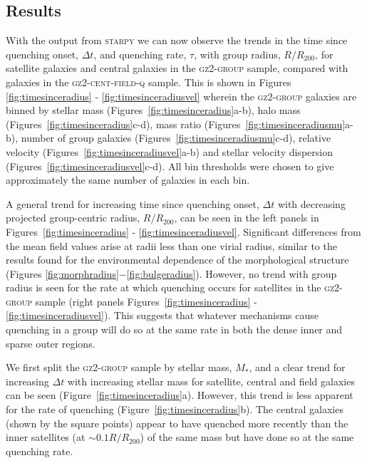 \documentclass[useAMS,usenatbib]{mn2e}
\begin{document}
\subsection{Results}\label{sec:resultssfhs}

With the output from \textsc{starpy} we can now observe the trends in the time since quenching onset, $\Delta t$, and quenching rate, $\tau$, with group radius, $R/R_{200}$, for satellite galaxies and central galaxies in the \textsc{gz2-group} sample, compared with galaxies in the \textsc{gz2-cent-field-q} sample. This is shown in Figures \ref{fig:timesinceradius} - \ref{fig:timesinceradiusvel} wherein the \textsc{gz2-group} galaxies are binned by stellar mass (Figures~\ref{fig:timesinceradius}a-b), halo mass (Figures~\ref{fig:timesinceradius}c-d), mass ratio (Figures~\ref{fig:timesinceradiusmu}a-b), number of group galaxies (Figures~\ref{fig:timesinceradiusmu}c-d), relative velocity (Figures~\ref{fig:timesinceradiusvel}a-b) and stellar velocity dispersion (Figures~\ref{fig:timesinceradiusvel}c-d). All bin thresholds were chosen to give approximately the same number of galaxies in each bin. 

A general trend for increasing time since quenching onset, $\Delta t$ with decreasing projected group-centric radius, $R/R_{200}$, can be seen in the left panels in Figures~\ref{fig:timesinceradius} - \ref{fig:timesinceradiusvel}. Significant differences from the mean field values arise at radii less than one virial radius, similar to the results found for the environmental dependence of the morphological structure (Figures \ref{fig:morphradius}$-$\ref{fig:bulgeradius}). However, no trend with group radius is seen for the rate at which quenching occurs for satellites in the \textsc{gz2-group} sample (right panels Figures~\ref{fig:timesinceradius} - \ref{fig:timesinceradiusvel}). This suggests that whatever mechanisms cause quenching in a group will do so at the same rate in both the dense inner and sparse outer regions. 

We first split the \textsc{gz2-group} sample by stellar mass, $M_*$, and a clear trend for increasing $\Delta t$ with increasing stellar mass for satellite, central and field galaxies can be seen (Figure~\ref{fig:timesinceradius}a). However, this trend is less apparent for the rate of quenching (Figure~\ref{fig:timesinceradius}b). The central galaxies (shown by the square points) appear to have quenched more recently than the inner satellites (at $\sim0.1R/R_{200}$) of the same mass but have done so at the same quenching rate. 
\end{document}
